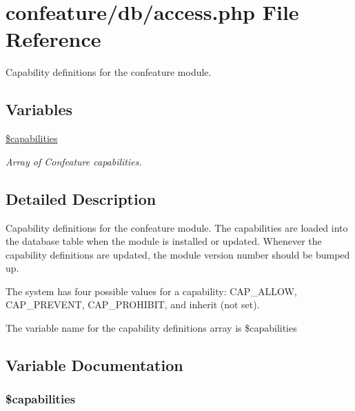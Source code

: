 \hypertarget{access_8php}{\section{confeature/db/access.php File Reference}
\label{access_8php}
}


Capability definitions for the confeature module.  


\subsection*{Variables}
\begin{DoxyCompactItemize}
\item 
\hyperlink{access_8php_a3bd1a55d998861e02e56c127f4b46c94}{\$capabilities}
\begin{DoxyCompactList}\small\item\em Array of Confeature capabilities. \end{DoxyCompactList}\end{DoxyCompactItemize}


\subsection{Detailed Description}
Capability definitions for the confeature module. The capabilities are loaded into the database table when the module is installed or updated. Whenever the capability definitions are updated, the module version number should be bumped up.

The system has four possible values for a capability\-: C\-A\-P\-\_\-\-A\-L\-L\-O\-W, C\-A\-P\-\_\-\-P\-R\-E\-V\-E\-N\-T, C\-A\-P\-\_\-\-P\-R\-O\-H\-I\-B\-I\-T, and inherit (not set).

The variable name for the capability definitions array is \$capabilities 

\subsection{Variable Documentation}
\hypertarget{access_8php_a3bd1a55d998861e02e56c127f4b46c94}{
\subsubsection[{\$capabilities}]{\setlength{\rightskip}{0pt plus 5cm}\$capabilities}}\label{access_8php_a3bd1a55d998861e02e56c127f4b46c94}


